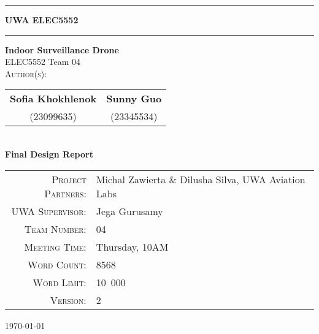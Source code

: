 \begin{titlepage}

\noindent\rule{\textwidth}{0.5pt}
\begin{flushright}
    \textbf{UWA ELEC5552}
\end{flushright}
\rule{\textwidth}{0.5pt}

\vspace{2cm}

\thispagestyle{empty}

\begin{center}
    {\Huge \textbf{Indoor Surveillance Drone}} \\[0.75cm]
    {\Large ELEC5552 Team 04} \\[1.5cm]

    \textsc{Author(s):} \\[0.5cm]

    \begin{tabular}{@{}c@{\hskip 1cm}c@{}}
        \textbf{Sofia Khokhlenok} & \textbf{Sunny Guo} \\[0.2cm]
        (23099635) & (23345534) \\
    \end{tabular} \\[1.5cm]

    {\Large \textbf{Final Design Report}} \\[0.5cm]
\end{center}

\vspace{1.5cm}

\begin{center}
\begin{tabular}{rl}
\textsc{Project Partners:} & Michal Zawierta \& Dilusha Silva, UWA Aviation Labs \\
\textsc{UWA Supervisor:} & Jega Gurusamy \\
\textsc{Team Number:} & 04 \\
\textsc{Meeting Time:} & Thursday, 10AM \\
\textsc{Word Count:} & 8568 \\
\textsc{Word Limit:} & 10~000 \\
\textsc{Version:} & 2 \\
\end{tabular}
\end{center}

\vfill

\begin{center}
    \large \today
\end{center}

\end{titlepage}
